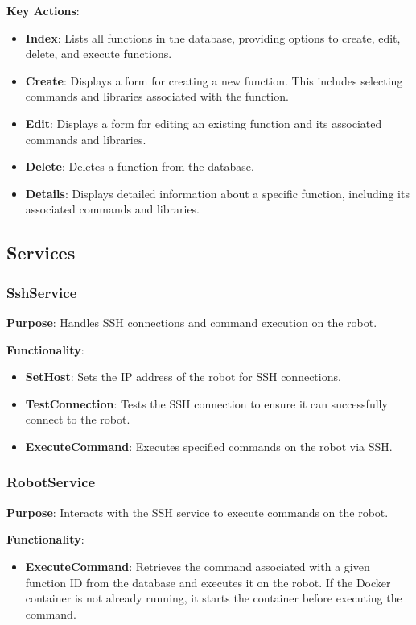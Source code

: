 \textbf{Key Actions}:
\begin{itemize}
	\item \textbf{Index}: Lists all functions in the database, providing options to create, edit, delete, and execute functions.
	\item \textbf{Create}: Displays a form for creating a new function. This includes selecting commands and libraries associated with the function.
	\item \textbf{Edit}: Displays a form for editing an existing function and its associated commands and libraries.
	\item \textbf{Delete}: Deletes a function from the database.
	\item \textbf{Details}: Displays detailed information about a specific function, including its associated commands and libraries.
\end{itemize}

\subsection{Services}

\subsubsection{SshService}
\textbf{Purpose}: Handles SSH connections and command execution on the robot.

\textbf{Functionality}:
\begin{itemize}
	\item \textbf{SetHost}: Sets the IP address of the robot for SSH connections.
	\item \textbf{TestConnection}: Tests the SSH connection to ensure it can successfully connect to the robot.
	\item \textbf{ExecuteCommand}: Executes specified commands on the robot via SSH.
\end{itemize}

\subsubsection{RobotService}
\textbf{Purpose}: Interacts with the SSH service to execute commands on the robot.

\textbf{Functionality}:
\begin{itemize}
	\item \textbf{ExecuteCommand}: Retrieves the command associated with a given function ID from the database and executes it on the robot. If the Docker container is not already running, it starts the container before executing the command.
\end{itemize}
